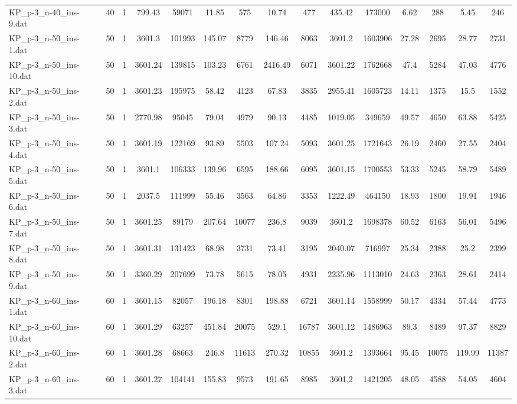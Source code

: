 \begin{table}[!ht]
{\begin{tabular}{lcccccccccccccc}
KP\_p-3\_n-40\_ins-9.dat & 40 & 1 & 799.43 & 59071 & 11.85 & 575 & 10.74 & 477 & 435.42 & 173000 & 6.62 & 288 & 5.45 & 246 \\
KP\_p-3\_n-50\_ins-1.dat & 50 & 1 & 3601.3 & 101993 & 145.07 & 8779 & 146.46 & 8063 & 3601.2 & 1603906 & 27.28 & 2695 & 28.77 & 2731 \\
KP\_p-3\_n-50\_ins-10.dat & 50 & 1 & 3601.24 & 139815 & 103.23 & 6761 & 2416.49 & 6071 & 3601.22 & 1762668 & 47.4 & 5284 & 47.03 & 4776 \\
KP\_p-3\_n-50\_ins-2.dat & 50 & 1 & 3601.23 & 195975 & 58.42 & 4123 & 67.83 & 3835 & 2955.41 & 1605723 & 14.11 & 1375 & 15.5 & 1552 \\
KP\_p-3\_n-50\_ins-3.dat & 50 & 1 & 2770.98 & 95045 & 79.04 & 4979 & 90.13 & 4485 & 1019.05 & 349659 & 49.57 & 4650 & 63.88 & 5425 \\
KP\_p-3\_n-50\_ins-4.dat & 50 & 1 & 3601.19 & 122169 & 93.89 & 5503 & 107.24 & 5093 & 3601.25 & 1721643 & 26.19 & 2460 & 27.55 & 2404 \\
KP\_p-3\_n-50\_ins-5.dat & 50 & 1 & 3601.1 & 106333 & 139.96 & 6595 & 188.66 & 6095 & 3601.15 & 1700553 & 53.33 & 5245 & 58.79 & 5489 \\
KP\_p-3\_n-50\_ins-6.dat & 50 & 1 & 2037.5 & 111999 & 55.46 & 3563 & 64.86 & 3353 & 1222.49 & 464150 & 18.93 & 1800 & 19.91 & 1946 \\
KP\_p-3\_n-50\_ins-7.dat & 50 & 1 & 3601.25 & 89179 & 207.64 & 10077 & 236.8 & 9039 & 3601.2 & 1698378 & 60.52 & 6163 & 56.01 & 5496 \\
KP\_p-3\_n-50\_ins-8.dat & 50 & 1 & 3601.31 & 131423 & 68.98 & 3731 & 73.41 & 3195 & 2040.07 & 716997 & 25.34 & 2388 & 25.2 & 2399 \\
KP\_p-3\_n-50\_ins-9.dat & 50 & 1 & 3360.29 & 207699 & 73.78 & 5615 & 78.05 & 4931 & 2235.96 & 1113010 & 24.63 & 2363 & 28.61 & 2414 \\
KP\_p-3\_n-60\_ins-1.dat & 60 & 1 & 3601.15 & 82057 & 196.18 & 8301 & 198.88 & 6721 & 3601.14 & 1558999 & 50.17 & 4334 & 57.44 & 4773 \\
KP\_p-3\_n-60\_ins-10.dat & 60 & 1 & 3601.29 & 63257 & 451.84 & 20075 & 529.1 & 16787 & 3601.12 & 1486963 & 89.3 & 8489 & 97.37 & 8829 \\
KP\_p-3\_n-60\_ins-2.dat & 60 & 1 & 3601.28 & 68663 & 246.8 & 11613 & 270.32 & 10855 & 3601.2 & 1393664 & 95.45 & 10075 & 119.99 & 11387 \\
KP\_p-3\_n-60\_ins-3.dat & 60 & 1 & 3601.27 & 104141 & 155.83 & 9573 & 191.65 & 8985 & 3601.2 & 1421205 & 48.05 & 4588 & 54.05 & 4604 \\

\end{tabular}}
\end{table}

